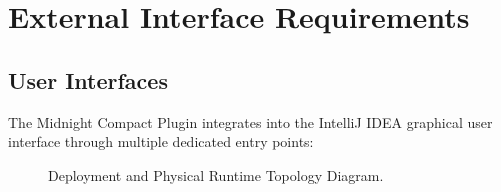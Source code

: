 \section{External Interface Requirements}
\label{sec:external_interfaces}

\subsection{User Interfaces}
\label{sec:user_interfaces}

The Midnight Compact Plugin integrates into the IntelliJ IDEA graphical user interface through multiple dedicated entry points:

\begin{figure}[htbp]
    \centering
    
    \caption{Deployment and Physical Runtime Topology Diagram.}
    \label{fig:deployment_diagram}
\end{figure}

